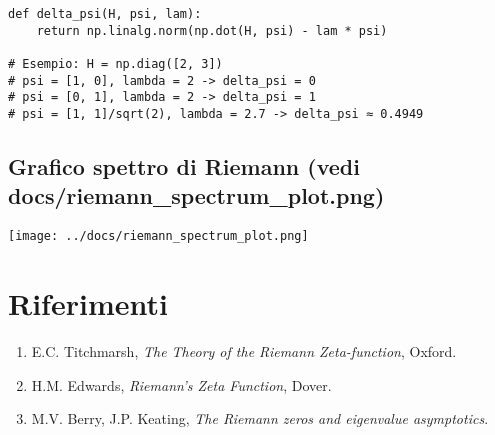 \documentclass[12pt]{article}
\theoremstyle{definition}
\begin{document}
\begin{verbatim}
def delta_psi(H, psi, lam):
    return np.linalg.norm(np.dot(H, psi) - lam * psi)

# Esempio: H = np.diag([2, 3])
# psi = [1, 0], lambda = 2 -> delta_psi = 0
# psi = [0, 1], lambda = 2 -> delta_psi = 1
# psi = [1, 1]/sqrt(2), lambda = 2.7 -> delta_psi ≈ 0.4949
\end{verbatim}

\subsection{Grafico spettro di Riemann (vedi docs/riemann_spectrum_plot.png)}

\begin{center}
\texttt{[image: ../docs/riemann\_spectrum\_plot.png]}
\end{center}

\section*{Riferimenti}

\begin{enumerate}
    \item E.C. Titchmarsh, \emph{The Theory of the Riemann Zeta-function}, Oxford.
    \item H.M. Edwards, \emph{Riemann's Zeta Function}, Dover.
    \item M.V. Berry, J.P. Keating, \emph{The Riemann zeros and eigenvalue asymptotics}.
\end{enumerate}
\end{document}
